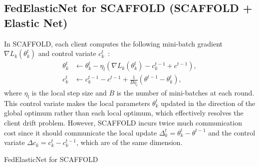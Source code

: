 \documentclass{article} %
\begin{document}
\subsection{FedElasticNet for SCAFFOLD (SCAFFOLD + Elastic Net)} \label{section:scaffold}

In SCAFFOLD, each client computes the following mini-batch gradient $\nabla L_k(\theta_k^t)$ and control variate $c_k^t$~\citep{Karimireddy2020scaffold}:
\begin{align}
    \theta_{k}^{t} &\gets \theta_k^{t} - \eta_{l}\left ( \nabla L_{k}\left ( \theta_{k}^{t} \right ) - c_{k}^{t-1} +c^{t-1}\right), \label{eq:scaffold_gradient}\\
    c^{t}_{k} & \gets c_{k}^{t-1} - c^{t-1} + \frac{1}{B\eta_{l}}(\theta^{t-1} - \theta^{t}_{k}),
\end{align}
where $\eta_l$ is the local step size and $B$ is the number of mini-batches at each round. This control variate makes the local parameters $\theta_k^t$ updated in the direction of the global optimum rather than each local optimum, which effectively resolves the client drift problem. However, SCAFFOLD incurs twice much communication cost since it should communicate the local update $\Delta_k^t = \theta_{k}^{t} - \theta^{t-1}$ and the control variate $\Delta c_{k} = c^{t}_{k} - c_{k}^{t-1}$, which are of the same dimension.

\begin{algorithm*}[t]
    \caption{FedElasticNet for SCAFFOLD}
    \label{algo:SCAFFOLD}
    \begin{algorithmic}[1]
    \EndFor
    \ENDFORPAR
    \EndFor
\end{algorithmic}
\end{algorithm*}
\end{document}
